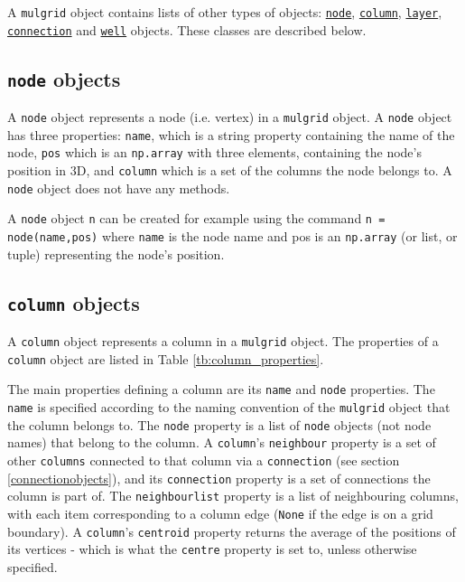 A \texttt{mulgrid} object contains lists of other types of objects: \hyperref[nodeobjects]{\texttt{node}}, \hyperref[columnobjects]{\texttt{column}}, \hyperref[layerobjects]{\texttt{layer}}, \hyperref[connectionobjects]{\texttt{connection}} and \hyperref[wellobjects]{\texttt{well}} objects.  These classes are described below.

\subsection{\texttt{node} objects}
\label{nodeobjects}

A \texttt{node} object represents a node (i.e. vertex) in a \texttt{mulgrid} object.  A \texttt{node} object has three properties: \texttt{name}, which is a string property containing the name of the node, \texttt{pos} which is an \texttt{np.array} with three elements, containing the node's position in 3D, and \texttt{column} which is a set of the columns the node belongs to.  A \texttt{node} object does not have any methods.

A \texttt{node} object \texttt{n} can be created for example using the command \texttt{n = node(name,pos)} where \texttt{name} is the node name and pos is an \texttt{np.array} (or list, or tuple) representing the node's position.

\subsection{\texttt{column} objects}
\label{columnobjects}

A \texttt{column} object represents a column in a \texttt{mulgrid} object.  The properties of a \texttt{column} object are listed in Table \ref{tb:column_properties}.

The main properties defining a column are its \texttt{name} and \texttt{node} properties.  The \texttt{name} is specified according to the naming convention of the \texttt{mulgrid} object that the column belongs to.  The \texttt{node} property is a list of \texttt{node} objects (not node names) that belong to the column.  A \texttt{column}'s \texttt{neighbour} property is a set of other \texttt{columns} connected to that column via a \texttt{connection} (see section \ref{connectionobjects}), and its \texttt{connection} property is a set of connections the column is part of.  The \texttt{neighbourlist} property is a list of neighbouring columns, with each item corresponding to a column edge (\texttt{None} if the edge is on a grid boundary).  A \texttt{column}'s \texttt{centroid} property returns the average of the positions of its vertices - which is what the \texttt{centre} property is set to, unless otherwise specified.

